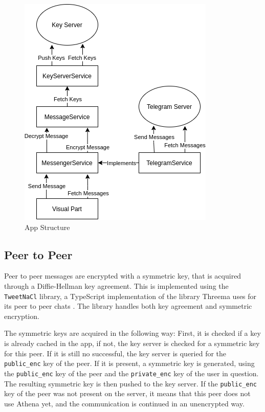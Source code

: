 \documentclass[a4paper, oneside]{discothesis}
\begin{document}
\begin{figure}[h!]
    \centering
    \includegraphics[width=0.8\columnwidth]{figures/layers.png}
    \caption{App Structure}
    \label{fig:layers}
\end{figure}


\subsection{Peer to Peer}
\label{sec:p2p_implementation}

Peer to peer messages are encrypted with a symmetric key, that is acquired through a Diffie-Hellman key agreement. This is implemented using the \texttt{TweetNaCl} library, a TypeScript implementation of the library Threema uses for its peer to peer chats \cite{Threema, TweetNaCl}. The library handles both key agreement and symmetric encryption.

The symmetric keys are acquired in the following way: First, it is checked if a key is already cached in the app, if not, the key server is checked for a symmetric key for this peer. If it is still no successful, the key server is queried for the \texttt{public\_enc} key of the peer. If it is present, a symmetric key is generated, using the \texttt{public\_enc} key of the peer and the \texttt{private\_enc} key of the user in question. The resulting symmetric key is then pushed to the key server. If the \texttt{public\_enc} key of the peer was not present on the server, it means that this peer does not use Athena yet, and the communication is continued in an unencrypted way.
\end{document}
